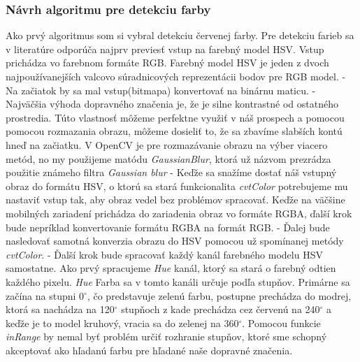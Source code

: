 \documentclass[12pt]{article}
\begin{document}
\subsubsection{Návrh algoritmu pre detekciu farby}
Ako prvý algoritmus som si vybral detekciu červenej farby. Pre detekciu farieb sa v literatúre odporúča najprv previesť vstup na farebný model HSV. 
Vstup prichádza vo farebnom formáte RGB. Farebný model HSV je jeden z dvoch najpoužívanejších valcovo súradnicových reprezentácii bodov pre RGB model.
\cite{hsl_hsv_wiki_en}
\linebreak
\linebreak
- Na začiatok by sa mal vstup(bitmapa) konvertovať na binárnu maticu.
\linebreak
\linebreak
- Najväčšia výhoda dopravného značenia je, že je silne kontrastné od ostatného prostredia.
Túto vlastnosť môžeme perfektne využiť v náš prospech a pomocou pomocou rozmazania obrazu, môžeme dosieliť to,
že sa zbavíme slabších kontú hneď na začiatku. V OpenCV je pre rozmazávanie obrazu na výber viacero metód,
no my použijeme matódu \emph{GaussianBlur}, ktorá už názvom prezrádza použitie známeho filtra \emph{Gaussian blur}
\linebreak
\linebreak
- Keďže sa snažíme dostať náš vstupný obraz do formátu HSV, o ktorú sa stará funkcionalita \emph{cvtColor} 
potrebujeme mu nastaviť vstup tak, aby obraz vedel bez problémov spracovať. 
Keďže na väčšine mobilných zariadení prichádza do zariadenia obraz vo formáte RGBA, ďalší krok bude nepríklad konvertovanie formátu RGBA na formát RGB.
\linebreak
\linebreak
- Ďalej bude nasledovať samotná konverzia obrazu do HSV pomocou už spomínanej metódy \emph{cvtColor}.
\linebreak
\linebreak
- Ďalší krok bude spracovať každý kanál farebného modelu HSV samostatne. Ako prvý spracujeme \emph{Hue} kanál, ktorý sa stará o farebný odtien každého pixelu.
\emph{Hue} Farba sa v tomto kanáli určuje podľa stupňov. 
Primárne sa začína na stupni 0$^\circ$, čo predstavuje zelenú farbu, postupne prechádza do modrej,
ktorá sa nachádza na 120$^\circ$ stupňoch z kade prechádza cez červenú na 240$^\circ$ a keďže je to model kruhový, vracia sa do zelenej na 360$^\circ$.
Pomocou funkcie \emph{inRange} by nemal byť problém určiť rozhranie stupňov, ktoré sme schopný akceptovať ako hľadanú farbu pre hľadané naše dopravné značenia.
\end{document}
